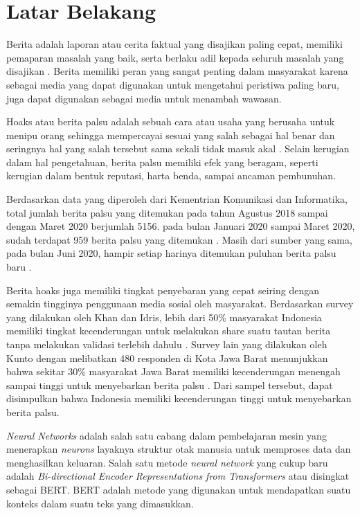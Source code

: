 \section{Latar Belakang}
\label{sec:latarbelakang}

Berita adalah laporan atau cerita faktual yang disajikan paling cepat, memiliki pemaparan masalah yang baik, serta berlaku adil kepada seluruh masalah yang disajikan \cite{rani2013persepsi}. Berita memiliki peran yang sangat penting dalam masyarakat karena sebagai media yang dapat digunakan untuk mengetahui peristiwa paling baru, juga dapat digunakan sebagai media untuk menambah wawasan.

Hoaks atau berita palsu adalah sebuah cara atau usaha yang berusaha untuk menipu orang sehingga mempercayai sesuai yang salah sebagai hal benar dan seringnya hal yang salah tersebut sama sekali tidak masuk akal \cite{berita_bohong}. Selain kerugian dalam hal pengetahuan, berita palsu memiliki efek yang beragam, seperti kerugian dalam bentuk reputasi, harta benda, sampai ancaman pembunuhan.

Berdasarkan data yang diperoleh dari Kementrian Komunikasi dan Informatika,  total jumlah berita palsu yang ditemukan pada tahun Agustus 2018 sampai dengan Maret 2020 berjumlah 5156. pada bulan Januari 2020 sampai Maret 2020, sudah terdapat 959 berita palsu yang ditemukan \cite{kominfoStatHoax}. Masih dari sumber yang sama, pada bulan Juni 2020, hampir setiap harinya ditemukan puluhan berita palsu baru \cite{kominfoJuni2020}.

Berita hoaks juga memiliki tingkat penyebaran yang cepat seiring dengan semakin tingginya penggunaan media sosial oleh masyarakat. Berdasarkan survey yang dilakukan oleh Khan dan Idris, lebih dari 50\% masyarakat Indonesia memiliki tingkat kecenderungan untuk melakukan share suatu tautan berita tanpa melakukan validasi terlebih dahulu \cite{khan}. Survey lain yang dilakukan oleh Kunto dengan melibatkan 480 responden di Kota Jawa Barat menunjukkan bahwa sekitar 30\% masyarakat Jawa Barat memiliki kecenderungan menengah sampai tinggi untuk menyebarkan berita palsu \cite{kuntoUmur}. Dari sampel tersebut, dapat disimpulkan bahwa Indonesia memiliki kecenderungan tinggi untuk menyebarkan berita palsu.

\textit{Neural Networks} adalah salah satu cabang dalam pembelajaran mesin yang menerapkan \textit{neurons} layaknya struktur otak manusia untuk memproses data dan menghasilkan keluaran. Salah satu metode \textit{neural network} yang cukup baru adalah \textit{Bi-directional Encoder Representations from Transformers} atau disingkat sebagai BERT. BERT adalah metode yang digunakan untuk mendapatkan suatu konteks dalam suatu teks yang dimasukkan.

